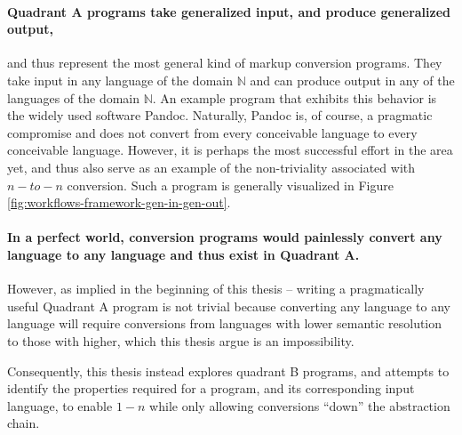 \documentclass{scrreprt}
\begin{document}
\paragraph{Quadrant A programs take generalized input, and produce generalized output,}
and thus represent the most general kind of markup conversion programs. They take input in any language of the domain $\mathbb{N}$ and can produce output in any of the languages of the domain $\mathbb{N}$. An example program that exhibits this behavior is the widely used software Pandoc\footnotePandoc{}. Naturally, Pandoc\footnotePandoc{} is, of course, a pragmatic compromise and does not convert from every conceivable language to every conceivable language. However, it is perhaps the most successful effort in the area yet, and thus also serve as an example of the non-triviality associated with $n-to-n$ conversion. Such a program is generally visualized in Figure \ref{fig:workflows-framework-gen-in-gen-out}.



\paragraph{In a perfect world, conversion programs would painlessly convert any language to any language and thus exist in  Quadrant A.} However, as implied in the beginning of this thesis -- writing a pragmatically useful Quadrant A program is not trivial because converting any language to any language will require conversions from languages with lower semantic resolution to those with higher, which this thesis argue is an impossibility.

Consequently, this thesis instead explores quadrant B programs, and attempts to identify the properties required for a program, and its corresponding input language, to enable $1-n$ while only allowing conversions ``down'' the abstraction chain.


\end{document}
